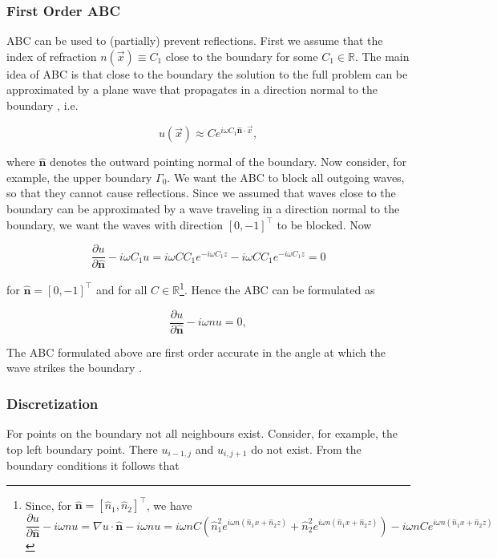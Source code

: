 \documentclass[10pt,a4paper]{article}
\newcommand{\x}{\vec{x}}
\newcommand{\n}{\mathbf{n}}
\begin{document}
\subsubsection{First Order ABC}
ABC can be used to (partially) prevent reflections. First we assume that the index of refraction $n(\x)\equiv C_1$ close to the boundary for some $C_1\in \mathbb{R}$. The main idea of ABC is that close to the boundary the solution to the full problem can be approximated by a plane wave that propagates in a direction normal to the boundary \cite{LectNotes}, i.e.

\begin{equation}
u(\x) \approx Ce^{i\omega C_1 \hat{\n}\cdot \x},
\end{equation}

where $\hat{\n}$ denotes the outward pointing normal of the boundary. Now consider, for example, the upper boundary $\Gamma_0$. We want the ABC to block all outgoing waves, so that they cannot cause reflections. Since we assumed that waves close to the boundary can be approximated by a wave traveling in a direction normal to the boundary, we want the waves with direction $[0,-1]^\top$ to be blocked. Now

\begin{equation}
\frac{\partial u}{\partial \hat{\n}} -i\omega C_1 u = i\omega CC_1e^{-i\omega C_1z} - i\omega CC_1e^{-i \omega C_1 z} = 0
\end{equation}

for $\hat{\n}=[0,-1]^\top$ and for all $C\in\mathbb{R}$\footnote{Since, for $\hat{\n} = [\hat{n}_1,\hat{n}_2]^\top$, we have 
	\begin{equation*}
	\frac{\partial u}{\partial \hat{\n}} -i\omega nu= \nabla u\cdot \hat{\n} -i\omega nu= i\omega nC (\hat{n}_1^2 e^{i\omega n(\hat{n}_1x+\hat{n}_2z)} + \hat{n}_2^2e^{i\omega n(\hat{n}_1x+\hat{n}_2z)})-i\omega nCe^{i\omega n(\hat{n}_1x+\hat{n}_2z)}
	\end{equation*}}. Hence the ABC can be formulated as

\begin{equation}
\frac{\partial u}{\partial \hat{\n}} - i\omega nu=0,
\end{equation}

The ABC formulated above are first order accurate in the angle at which the wave strikes the boundary \cite{AbsorpationRates}.

\subsubsection{Discretization}
For points on the boundary not all neighbours exist. Consider, for example, the top left boundary point. There $u_{i-1,j}$ and $u_{i,j+1}$ do not exist. From the boundary conditions it follows that
\end{document}
